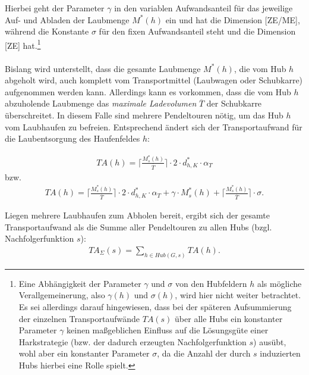 \documentclass[fontsize=12pt,doubleside,openany,listof=totoc,listof=flat,listof=nochaptergap,numbers=noenddot]{article}
\begin{document}
Hierbei geht der Parameter $\gamma$ in den variablen Aufwandsanteil für das jeweilige Auf- und Abladen der Laubmenge $M^*(h)$ ein und hat die Dimension [ZE/ME], während die Konstante $\sigma$ für den fixen Aufwandsanteil steht und die Dimension [ZE] hat.\footnote{Eine Abhängigkeit der Parameter $\gamma$ und $\sigma$ von den Hubfeldern $h$ als mögliche Verallgemeinerung, also $\gamma(h)$ und $\sigma(h)$, wird hier nicht weiter betrachtet. Es sei allerdings darauf hingewiesen, dass bei der späteren Aufsummierung der einzelnen Transportaufwände $TA(s)$ über alle Hubs ein konstanter Parameter $\gamma$ keinen maßgeblichen Einfluss auf die Lösungsgüte einer Harkstrategie (bzw. der dadurch erzeugten Nachfolgerfunktion $s$) ausübt, wohl aber ein konstanter Parameter $\sigma$, da die Anzahl der durch $s$ induzierten Hubs hierbei eine Rolle spielt.}
\\ \\
Bislang wird unterstellt, dass die gesamte Laubmenge $M^*(h)$, die vom Hub $h$ 
abgeholt wird, auch komplett vom Transportmittel (Laubwagen oder Schubkarre) aufgenommen 
werden kann. Allerdings kann es vorkommen, dass die vom Hub $h$ 
abzuholende Laubmenge das \textit{maximale Ladevolumen}\label{Ladevolumen}
$\overline{T}$ der Schubkarre überschreitet. In diesem Falle sind mehrere
Pendeltouren nötig, um das Hub $h$ vom Laubhaufen zu befreien. Entsprechend
ändert sich der Transportaufwand für die Laubentsorgung des Haufenfeldes $h$:

\begin{align*}
TA(h) = \Big\lceil \frac{M^*_s(h)}{\overline{T}} \Big\rceil \cdot 2 \cdot d^*_{h,K} \cdot \alpha_T
\end{align*}
bzw. 
\begin{align*}
TA(h) = \Big\lceil \frac{M^*_s(h)}{\overline{T}} \Big\rceil  \cdot 2 \cdot d^*_{h,K} \cdot \alpha_T +
\gamma \cdot M^*_s(h) + \Big\lceil \frac{M^*_s(h)}{\overline{T}} \Big\rceil \cdot \sigma.
\end{align*}

\noindent Liegen mehrere Laubhaufen zum Abholen bereit, ergibt sich der gesamte 
Transportaufwand als die Summe aller Pendeltouren zu allen Hubs (bzgl. Nachfolgerfunktion $s$):
\begin{align*}
TA_\Sigma(s) = \sum_{h \in Hub(G,s)} TA(h).
\end{align*}
\end{document}
